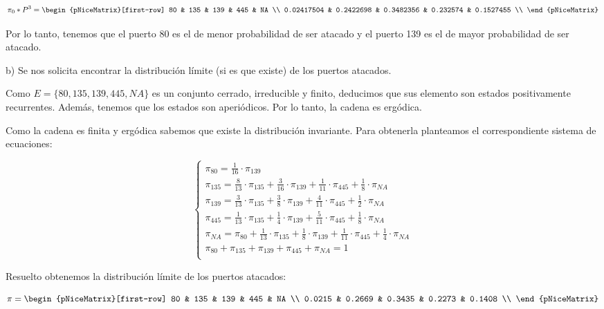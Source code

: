 \documentclass[11pt]{article}
\begin{document}
\begin{equation*}
    \pi_0 * P^3 = \begin{pNiceMatrix}[first-row]
        80         & 135       & 139       & 445      & NA        \\
        0.02417504 & 0.2422698 & 0.3482356 & 0.232574 & 0.1527455 \\
    \end{pNiceMatrix}
\end{equation*}

Por lo tanto, tenemos que el puerto 80 es el de menor probabilidad de ser atacado y el puerto 139 es el de mayor probabilidad de ser atacado. 

b) Se nos solicita encontrar la distribución límite (si es que existe) de los puertos atacados.

Como $E = \{80, 135, 139, 445, NA\}$ es un conjunto cerrado, irreducible y finito, deducimos que sus elemento son estados positivamente recurrentes. 
Además, tenemos que los estados son aperiódicos. Por lo tanto, la cadena es ergódica.

Como la cadena es finita y ergódica sabemos que existe la distribución invariante. Para obtenerla planteamos el correspondiente sistema de ecuaciones: 


\begin{equation*}
    \begin{cases}
        \pi_{80} = \frac{1}{16} \cdot \pi_{139} \\
        \pi_{135} = \frac{8}{13} \cdot \pi_{135} + \frac{3}{16} \cdot \pi_{139} + \frac{1}{11} \cdot \pi_{445} + \frac{1}{8} \cdot \pi_{NA} \\
        \pi_{139} = \frac{3}{13} \cdot \pi_{135} + \frac{3}{8} \cdot \pi_{139} + \frac{4}{11} \cdot \pi_{445} + \frac{1}{2} \cdot \pi_{NA} \\
        \pi_{445} = \frac{1}{13} \cdot \pi_{135} + \frac{1}{4} \cdot \pi_{139} + \frac{5}{11} \cdot \pi_{445} + \frac{1}{8} \cdot \pi_{NA} \\
        \pi_{NA} = \pi_{80} + \frac{1}{13} \cdot \pi_{135} + \frac{1}{8} \cdot \pi_{139} + \frac{1}{11} \cdot \pi_{445} + \frac{1}{4} \cdot \pi_{NA} \\
        \pi_{80} + \pi_{135} + \pi_{139} + \pi_{445} + \pi_{NA} = 1 \\
    \end{cases}
\end{equation*}

Resuelto obtenemos la distribución límite de los puertos atacados:

\begin{equation*}
    \pi = \begin{pNiceMatrix}[first-row]
        80     & 135    & 139    & 445    & NA     \\
        0.0215 & 0.2669 & 0.3435 & 0.2273 & 0.1408 \\
    \end{pNiceMatrix}
\end{equation*}
\end{document}
